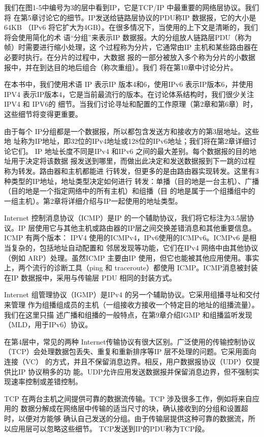 我们在图1-5中编号为3的层中看到IP，它是TCP/IP 中最重要的网络层协议。我们将
在第5章讨论它的细节。IP发送给链路层协议的PDU称IP 数据报，它的大小是64KB
（IPv6 将它扩大为4GB）。在很多情况下，当使用的上下文是清晰的，我们将会使用简化的术
语“分组”来表示IP 数据报。大的分组放人链路层PDU（称为帧）时需要进行缩小处理，这
个过程称为分片，它通常由IP 主机和某些路由器在必要时执行。在分片的过程中，大数据
报的一部分被放入多个称为分片的小数据报中，并在到达目的地后组合（称次重组）。我们
将在第10章中讨论分片。

在本书中，我们使用术语 IP 表示IP 版本4和6，使用IPv6 表示IP版本6，并使用 IPV4
表示IP版本4，它是当前最流行的版本。在讨论体系结构时，我们很少关注IPV4 和 IPV6的
细节。当我们讨论寻址和配置的工作原理（第2章和第6章）时，这些细节将变得更重要。

由于每个 IP分组都是一个数据报，所以都包含发送方和接收方的第3层地址。这些地
址称为IP地址，即32位的IPv4地址或128位的IPv6地址；我们将在第2章详细讨论它们。
IP 地址长度不同是IPv4 和IPv6 之间的最大差别。每个数据报的目的地址用于决定将该数据
报发送到哪里，而做出此决定和发送数据报到下一跳的过程称为转发。路由器和主机都能进
行转发，但更多的是由路由器实现转发。这里有3种类型的IP地址，地址类型决定如何进行
转发：单播（目的地是一台主机）、广播（目的地是一个指定网络中的所有主机）和组播（目
的地是属于一个组播组中的一组主机）。第2章将详细介绍与IP一起使用的地址类型。

Internet 控制消息协议（ICMP）是IP 的一个辅助协议，我们将它标注为3.5层协议。IP
层使用它与其他主机或路由器的IP层之间交换差错消息和其他重要信息。ICMP 有两个版本：
IPV4 使用的ICMPv4，IPv6使用的ICMPv6。ICMPv6 是相当复杂的，包括地址自动配置和
邻居发现等功能，它们在IPv4 网络中由其他协议（例如 ARP）处理。虽然ICMP 主要由IP
使用，但它也能被其他应用使用。事实上，两个流行的诊断工具（ping 和 traceroute）都使用
ICMP。ICMP消息被封装在IP 数据报中，采用与传输层 PDU 相同的封装方式。

Internet 组管理协议（IGMP）是IPv4 的另一个辅助协议。它采用组播寻址和交付来管理
作为组播组成员的主机（一组接收方接收一个特定目的地址的组播流量）。我们在这里只描
述广播和组播的一般特点，在第9章介绍IGMP 和组播监听发现（MLD，用于IPv6）协议。

在第4层中，常见的两种 Internet传输协议有很大区别。广泛使用的传输控制协议
（TCP）会处理数据包丢失、重复和重新排序等IP 层不处理的问题。它采用面向连接（VC）
的方式，并且不保留消息边界。相反，用户数据报协议（UDP）仅提供比IP 协议稍多的功
能。UDP允许应用发送数据报并保留消息边界，但不强制实现速率控制或差错控制。

TCP 在两台主机之间提供可靠的数据流传输。TCP 涉及很多工作，例如将来自应用的
数据分解成在网络层中传输的适当尺寸的块，确认接收到的分组和设置超时，以便对方能够
确认自己发送的分组。由于传输层提供这种可靠的数据流，所以应用层可以忽略这些细节。
TCP发送到IP的PDU称为TCP段。

